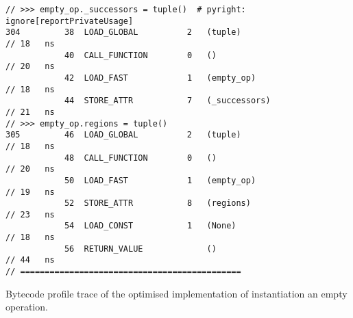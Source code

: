 \begin{code}
\begin{verbatim}
// >>> empty_op._successors = tuple()  # pyright: ignore[reportPrivateUsage]
304         38  LOAD_GLOBAL          2   (tuple)                                                    // 18   ns
            40  CALL_FUNCTION        0   ()                                                         // 20   ns
            42  LOAD_FAST            1   (empty_op)                                                 // 18   ns
            44  STORE_ATTR           7   (_successors)                                              // 21   ns
// >>> empty_op.regions = tuple()
305         46  LOAD_GLOBAL          2   (tuple)                                                    // 18   ns
            48  CALL_FUNCTION        0   ()                                                         // 20   ns
            50  LOAD_FAST            1   (empty_op)                                                 // 19   ns
            52  STORE_ATTR           8   (regions)                                                  // 23   ns
            54  LOAD_CONST           1   (None)                                                     // 18   ns
            56  RETURN_VALUE             ()                                                         // 44   ns
// =============================================
    \end{verbatim}
    \caption{Bytecode profile trace of the optimised implementation of instantiation an empty operation.}
    \label{listing:bytecode-profiles-op-build-optimised}
\end{code}



